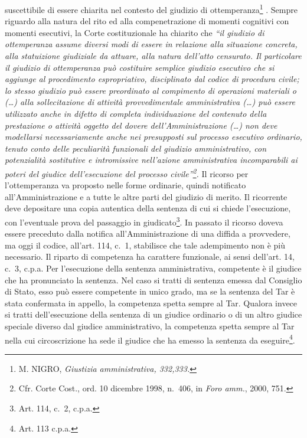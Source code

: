 \documentclass[12pt,it,a4paper,]{report}
\begin{document}
suscettibile di essere chiarita nel contesto del giudizio di
ottemperanza\footnote{M. NIGRO, \emph{Giustizia amministrativa,
  332,333.}} . Sempre riguardo alla natura del rito ed alla
compenetrazione di momenti cognitivi con momenti esecutivi, la Corte
costituzionale ha chiarito che \emph{``il giudizio di ottemperanza
assume diversi modi di essere in relazione alla situazione concreta,
alla statuizione giudiziale da attuare, alla natura dell'atto censurato.
Il particolare il giudizio di ottemperanza può costituire semplice
giudizio esecutivo che si aggiunge al procedimento espropriativo,
disciplinato dal codice di procedura civile; lo stesso giudizio può
essere preordinato al compimento di operazioni materiali o (\ldots) alla
sollecitazione di attività provvedimentale amministrativa (\ldots) può
essere utilizzato anche in difetto di completa individuazione del
contenuto della prestazione o attività oggetto del dovere
dell'Amministrazione (\ldots) non deve modellarsi necessariamente anche
nei presupposti sul processo esecutivo ordinario, tenuto conto delle
peculiarità funzionali del giudizio amministrativo, con potenzialità
sostitutive e intromissive nell'azione amministrativa incomparabili ai
poteri del giudice dell'esecuzione del processo civile''\footnote{Cfr.
  Corte Cost., ord. 10 dicembre 1998, n.~406, in \emph{Foro amm.}, 2000,
  751.}.} Il ricorso per l'ottemperanza va proposto nelle forme
ordinarie, quindi notificato all'Amministrazione e a tutte le altre
parti del giudizio di merito. Il ricorrente deve depositare una copia
autentica della sentenza di cui si chiede l'esecuzione, con l'eventuale
prova del passaggio in giudicato\footnote{Art. 114, c.~2, c.p.a.}. In
passato il ricorso doveva essere preceduto dalla notifica
all'Amministrazione di una diffida a provvedere, ma oggi il codice,
all'art. 114, c.~1, stabilisce che tale adempimento non è più
necessario. Il riparto di competenza ha carattere funzionale, ai sensi
dell'art. 14, c.~3, c.p.a. Per l'esecuzione della sentenza
amministrativa, competente è il giudice che ha pronunciato la sentenza.
Nel caso si tratti di sentenza emessa dal Consiglio di Stato, esso può
essere competente in unico grado, ma se la sentenza del Tar è stata
confermata in appello, la competenza spetta sempre al Tar. Qualora
invece si tratti dell'esecuzione della sentenza di un giudice ordinario
o di un altro giudice speciale diverso dal giudice amministrativo, la
competenza spetta sempre al Tar nella cui circoscrizione ha sede il
giudice che ha emesso la sentenza da eseguire\footnote{Art. 113 c.p.a.}.
\end{document}
